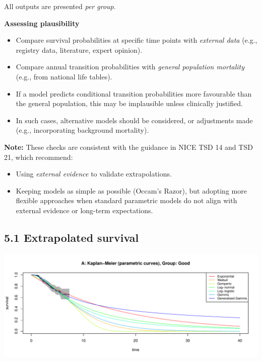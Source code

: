 \documentclass[
]{article}
\providecommand{\tightlist}{%
  \setlength{\itemsep}{0pt}\setlength{\parskip}{0pt}}
\begin{document}
All outputs are presented \emph{per group}.

\textbf{Assessing plausibility}

\begin{itemize}
\tightlist
\item
  Compare survival probabilities at specific time points with
  \emph{external data} (e.g., registry data, literature, expert
  opinion).\\
\item
  Compare annual transition probabilities with \emph{general population
  mortality} (e.g., from national life tables).\\
\item
  If a model predicts conditional transition probabilities more
  favourable than the general population, this may be implausible unless
  clinically justified.\\
\item
  In such cases, alternative models should be considered, or adjustments
  made (e.g., incorporating background mortality).
\end{itemize}

\textbf{Note:} These checks are consistent with the guidance in NICE TSD
14 and TSD 21, which recommend:

\begin{itemize}
\tightlist
\item
  Using \emph{external evidence} to validate extrapolations.\\
\item
  Keeping models as simple as possible (Occam's Razor), but adopting
  more flexible approaches when standard parametric models do not align
  with external evidence or long-term expectations.
\end{itemize}

\subsection{5.1 Extrapolated survival}\label{extrapolated-survival}

\begin{flushleft}\includegraphics[height=0.29\textheight]{BC_OS_output/Images/Figure_validate_extrapolation_KM-1} \end{flushleft}
\end{document}
